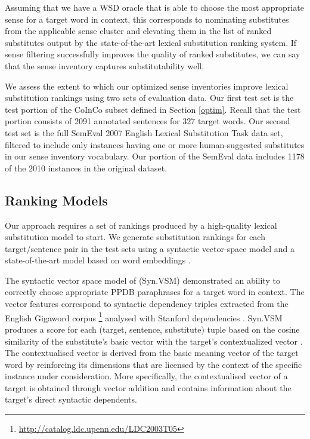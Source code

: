 \documentclass[11pt]{article}
\begin{document}
Assuming that we have a WSD oracle that is able to choose the most appropriate sense for a target word in context, this corresponds to nominating substitutes from the applicable sense cluster and elevating them in the list of ranked substitutes output by the state-of-the-art lexical substitution ranking system. 
If sense filtering successfully improves the quality of ranked substitutes, we can say that the sense inventory captures substitutability well. 


We assess the extent to which our optimized sense inventories improve lexical substitution rankings using two sets of evaluation data. Our first test set is the test portion of the CoInCo subset defined in Section \ref{optim}. Recall that the test portion consists of 2091 annotated sentences for 327 target words. Our second test set is the full SemEval 2007 English Lexical Substitution Task \cite{mccarthy-navigli:07} data set, filtered to include only instances having one or more human-suggested substitutes in our sense inventory vocabulary. Our portion of the SemEval data includes 1178 of the 2010 instances in the original dataset.   


\subsection{Ranking Models}

Our approach requires a set of rankings produced by a high-quality lexical substitution model to start. We generate substitution rankings for each target/sentence pair in the test sets using a syntactic vector-space model \cite{thater-furstenau-pinkal:2011:IJCNLP-2011,apidianaki:2016:EMNLP2016} and a state-of-the-art model based on word embeddings \cite{melamud-levy-dagan:2015:VSM-NLP}. 

The syntactic vector space model of  (Syn.VSM) demonstrated an ability to correctly choose appropriate PPDB paraphrases for a target word in context. The vector features correspond to syntactic dependency triples extracted from the English Gigaword corpus \footnote{\url{http://catalog.ldc.upenn.edu/LDC2003T05}} analysed with Stanford dependencies \cite{mcdm:06}. Syn.VSM produces a score for each (target, sentence, substitute) tuple based on the cosine similarity of the substitute's basic vector with the target's contextualized vector \cite{thater-furstenau-pinkal:2011:IJCNLP-2011}. The contextualised vector is derived from the basic meaning vector of the target word by reinforcing its dimensions that are licensed by the context of the specific instance under consideration. More specifically, the contextualised vector of a target is obtained through vector addition and contains information about the target's direct syntactic dependents. %
\end{document}
